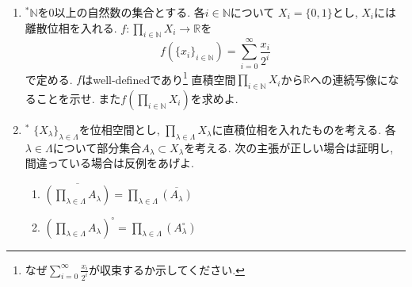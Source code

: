 \documentclass[dvipdfmx,a4paper,11pt]{article}
\newcommand{\R}{\mathbb{R}}
\newcommand{\N}{\mathbb{N}}
\theoremstyle{definition}
\begin{document}
\begin{enumerate}[ label=\textbf{問}\ref*{sec-product}.\arabic*]


\item $^{*}$$\N$を0以上の自然数の集合とする. 各$i \in \N$について $X_{i} = \{ 0,1\}$とし, $X_i$には離散位相を入れる.
$f :\prod_{i \in \N} X_{i} \rightarrow \R$を
$$
f (\{ x_i\}_{i \in \N}) = \sum_{i=0}^{\infty} \frac{x_i}{2^i}
$$
で定める. $f$はwell-definedであり\footnote{なぜ$\sum_{i=0}^{\infty} \frac{x_i}{2^i}$が収束するか示してください.} 
直積空間$\prod_{i \in \N} X_{i}$から$\R$への連続写像になることを示せ.
また$f(\prod_{i \in \N} X_{i})$を求めよ.


\item $^{*}$  $\{ X_\lambda \}_{\lambda \in \Lambda}$を位相空間とし, $\prod_{\lambda \in \Lambda} X_{\lambda} $に直積位相を入れたものを考える. 
各$\lambda \in \Lambda$について部分集合$A_{\lambda} \subset X_{\lambda}$を考える.  次の主張が正しい場合は証明し, 間違っている場合は反例をあげよ.
	\begin{enumerate}
		\setlength{\parskip}{0cm} 
  \setlength{\itemsep}{0pt} 
	\item $\overline{(\prod_{\lambda \in \Lambda} A_{\lambda})} =\prod_{\lambda \in \Lambda} \overline{(A_{\lambda})}$
	\item $(\prod_{\lambda \in \Lambda} A_{\lambda})^\circ=\prod_{\lambda \in \Lambda} (A_{\lambda}^\circ)$
	\end{enumerate}
	
\begin{comment}

\item $^{*}$ $[0,1]$上の実数値連続関数の集合$C([0,1])$とその距離$d_{\infty}$を\ref{conti}の通りとする.  $x \in [0,1]$について$X_x = \R$とおくことで, 
$C[0,1] \subset \prod_{x \in [0,1]} X_{x}$とみなせる. そこで$\prod_{x \in [0,1]} X_{x}$の積位相の$C[0,1]$への相対位相を$\mathscr{U}_W$とおく. 次の問いに答えよ.
\begin{enumerate}
\setlength{\parskip}{0cm}
  \setlength{\itemsep}{0pt} 
\item 関数列$\{ f_{i}\}_{i=1}^{\infty}$が$f \in C[0,1]$に各点収束することは, 位相空間$(C[0,1], \mathscr{U}_W)$において$\{ f_{i}\}_{i=1}^{\infty}$が$f \in C[0,1]$に収束することと同値であることを示せ. (後者の収束の定義に関しては\ref{pointwise}を参照せよ.)
\item $\mathscr{U}_p$は距離空間$(C[0,1],d_{\infty})$が作る位相$\mathscr{U}_{\infty}$よりも真に小さい, つまり$\mathscr{U}_W\subsetneq \mathscr{U}_{\infty}$であることを示せ.%
\end{enumerate}
\end{comment}


\end{enumerate}
\end{document}
